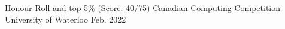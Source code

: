 
\begin{cvhonors}


  \cvhonor
    {Honour Roll and top 5\% (Score: 40/75)} %
    {Canadian Computing Competition} %
    {University of Waterloo} %
    {Feb. 2022} %


\end{cvhonors}
